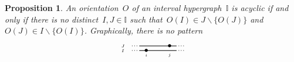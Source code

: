 \documentclass[reqno]{amsart}
\newtheorem{proposition}[theorem]{Proposition}
\theoremstyle{definition}
\newcommand{\I}{\mathbb{I}} %
\newcommand{\ssm}{\smallsetminus} %
\newcommand{\II}{\mathbb I} %
\begin{document}
\begin{proposition}
An orientation~$O$ of an interval hypergraph~$\II$ is acyclic if and only if there is no distinct~$I,J \in \I$ such that~$O(I) \in J \ssm \{O(J)\}$ and~$O(J) \in I \ssm \{O(I)\}$.
Graphically, there is no pattern
 \[
	\begin{tikzpicture}[scale=1,baseline=.0cm]
	\node at (-.5,0.2) {$\scriptscriptstyle J$}; 
	\node at (-.1,0.2) {$\scriptstyle \cdot$};
	\node at (0,0.2) {$\scriptstyle \cdot$};
	\node at (.1,0.2) {$\scriptstyle \cdot$};
	\draw [thick] (.2,.2)--(1.8,.2);
	\node at (1.9,.2) {$\scriptstyle \cdot$};
	\node at (2,.2) {$\scriptstyle \cdot$};
	\node at (2.1,.2) {$\scriptstyle \cdot$};
	\node at (1.5,.2) {$\bullet$};
	\node at (-.5,0) {$\scriptscriptstyle I$};
	\node at (-.1,0) {$\scriptstyle \cdot$};
	\node at (0,0) {$\scriptstyle \cdot$};
	\node at (.1,0) {$\scriptstyle \cdot$};
	\draw [thick] (.2,0)--(1.8,0);
	\node at (1.9,0) {$\scriptstyle \cdot$};
	\node at (2,0) {$\scriptstyle \cdot$};
	\node at (2.1,0) {$\scriptstyle \cdot$};
	\node at (.5,0) {$\bullet$};
	\node at (.5,-.2) {$\scriptscriptstyle i$};
	\node at (1.5,-.2) {$\scriptscriptstyle j$}; 
	\end{tikzpicture}
\]
\end{proposition}
\end{document}
